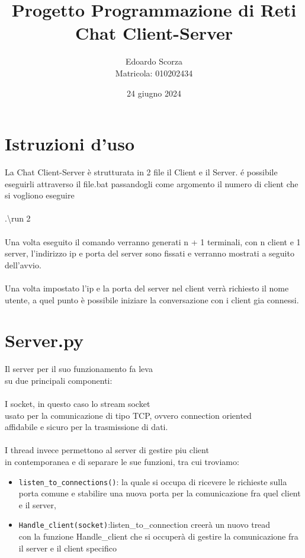 \documentclass[a4paper,12pt]{report}
\title{Progetto Programmazione di Reti 
    \\ Chat Client-Server}
\author{Edoardo Scorza \\ Matricola: 010202434}
\date{24 giugno 2024}
\begin{document}
\maketitle
\tableofcontents
\chapter*{Istruzioni d'uso}
La Chat Client-Server è strutturata in 2 file il Client e il Server.
é possibile eseguirli attraverso il file.bat passandogli come 
argomento il numero di client che si vogliono eseguire\\\\
.\textbackslash run 2\\\\
Una volta eseguito il comando verranno generati n + 1 terminali,
con n client e 1 server, l'indirizzo ip e porta del server sono fissati
e verranno mostrati a seguito dell'avvio.
\\\\
Una volta impostato l'ip e la porta del server nel client
verrà richiesto il nome utente, a quel punto è possibile iniziare la conversazione
con i client gia connessi.

\chapter*{Server.py}
Il server per il suo funzionamento fa leva\\
su due principali componenti:\\\\
I socket, in questo caso lo stream socket\\
usato per la comunicazione di tipo TCP, ovvero connection oriented\\
affidabile e sicuro per la trasmissione di dati.\\\\
I thread invece permettono al server di gestire piu client\\ in contemporanea
e di separare le sue funzioni, tra cui troviamo:
\begin{itemize}
    \item \texttt{listen\_to\_connections()}: la quale si occupa di ricevere le richieste sulla porta comune e stabilire una nuova porta per la comunicazione fra quel client e il server,
    \item \texttt{Handle\_client(socket)}:listen\_to\_connection creerà un nuovo tread\\ con la funzione Handle\_client che si occuperà di gestire la comunicazione fra il server e il client specifico
\end{itemize}
\end{document}
